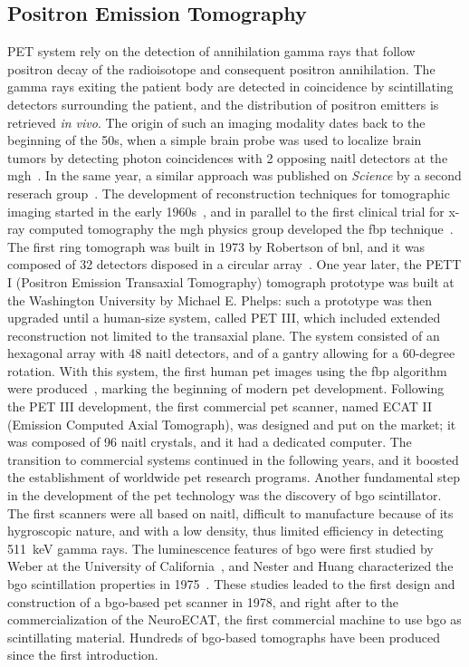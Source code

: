 \subsection{Positron Emission Tomography}\label{chap1::subsec::PET_NM}

PET system rely on the detection of annihilation gamma rays that follow positron decay of the radioisotope and consequent positron annihilation. The gamma rays exiting the patient body are detected in coincidence by scintillating detectors surrounding the patient, and the distribution of positron emitters is retrieved \textit{in vivo}.  The origin of such an imaging modality dates back to the beginning of the 50s, when a simple brain probe was used to localize brain tumors by detecting photon coincidences with 2 opposing \gls{naitl} detectors at the \gls{mgh}~\parencite{Sweet1951}. In the same year, a similar approach was published on \textit{Science} by a second reserach group~\parencite{Wrenn1951}. The development of reconstruction techniques for tomographic imaging started in the early 1960s~\parencite{Kuhl1963}, and in parallel to the first clinical trial for x-ray computed tomography the \gls{mgh} physics group developed the \gls{fbp} technique~\parencite{Chesler1971}. The first ring tomograph was built in 1973 by Robertson of \gls{bnl}, and it was composed of 32 detectors disposed in a circular array~\parencite{Robertson1972}. One year later, the PETT I (Positron Emission Transaxial Tomography) tomograph prototype was built at the Washington University by Michael E. Phelps: such a prototype was then upgraded until a human-size system, called PET III, which included extended reconstruction not limited to the transaxial plane. The system consisted of an hexagonal array with 48 \gls{naitl} detectors, and of a gantry allowing for a 60-degree rotation. With this system, the first human \gls{pet} images using the \gls{fbp} algorithm were produced~\parencite{Hoffmann1976}, marking the beginning of modern \gls{pet} development. Following the PET III development, the first commercial \gls{pet} scanner, named ECAT II (Emission Computed Axial Tomograph), was designed and put on the market; it was composed of 96 \gls{naitl} crystals, and it had a dedicated computer. The transition to commercial systems continued in the following years, and it boosted the establishment of worldwide \gls{pet} research programs. Another fundamental step in the development of the \gls{pet} technology was the discovery of \gls{bgo} scintillator. The first scanners were all based on \gls{naitl}, difficult to manufacture because of its hygroscopic nature, and with a low density, thus limited efficiency in detecting 511~keV gamma rays.  The luminescence features of \gls{bgo} were first studied by Weber at the University of California~\parencite{Weber1973}, and Nester and Huang characterized the \gls{bgo} scintillation properties in 1975~\parencite{Nestor1975}. These studies leaded to the first design and construction of a \gls{bgo}-based \gls{pet} scanner in 1978, and right after to the commercialization of the NeuroECAT, the first commercial machine to use \gls{bgo} as scintillating material. Hundreds of \gls{bgo}-based tomographs have been produced since the first introduction. 
